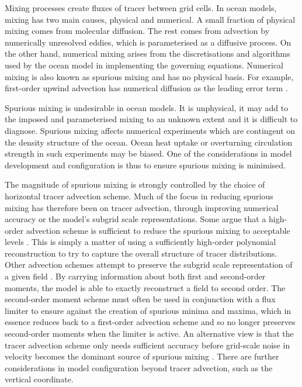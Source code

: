 Mixing processes create fluxes of tracer between grid cells. In ocean models, mixing has two main causes, physical and numerical. A small fraction of physical mixing comes from molecular diffusion. The rest comes from advection by numerically unresolved eddies, which is parameterised as a diffusive process. On the other hand, numerical mixing arises from the discretisations and algorithms used by the ocean model in implementing the governing equations. Numerical mixing is also known as spurious mixing and has no physical basis. For example, first-order upwind advection has numerical diffusion as the leading error term \citep{gentry66}.


Spurious mixing is undesirable in ocean models. It is unphysical, it may add to the imposed and parameterised mixing to an unknown extent and it is difficult to diagnose. Spurious mixing affects numerical experiments which are contingent on the density structure of the ocean. Ocean heat uptake or overturning circulation strength in such experiments may be biased. One of the considerations in model development and configuration is thus to ensure spurious mixing is minimised.

The magnitude of spurious mixing is strongly controlled by the choice of horizontal tracer advection scheme. Much of the focus in reducing spurious mixing has therefore been on tracer advection, through improving numerical accuracy or the model's subgrid scale representations. Some argue that a high-order advection scheme is sufficient to reduce the spurious mixing to acceptable levels \citep{daru04}. This is simply a matter of using a sufficiently high-order polynomial reconstruction to try to capture the overall structure of tracer distributions. Other advection schemes attempt to preserve the subgrid scale representation of a given field \citep{prather86}. By carrying information about both first and second-order moments, the model is able to exactly reconstruct a field to second order. The second-order moment scheme must often be used in conjunction with a flux limiter to ensure against the creation of spurious minima and maxima, which in essence reduces back to a first-order advection scheme and so no longer preserves second-order moments when the limiter is active. An alternative view is that the tracer advection scheme only needs sufficient accuracy before grid-scale noise in velocity becomes the dominant source of spurious mixing \citep{ilicak12}. There are further considerations in model configuration beyond tracer advection, such as the vertical coordinate.

